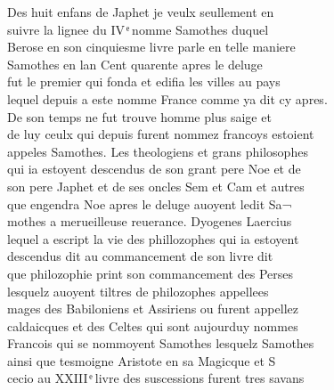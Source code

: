 \documentclass[12pt]{article}
\begin{document}
Des huit enfans de Japhet je veulx seullement en\\
suivre la lignee du
          IV ͤ nomme Samothes duquel\\
Berose en son cinquiesme livre
          parle en telle maniere\\
Samothes en lan Cent quarente apres le
                deluge\\
fut le premier qui fonda et edifia les villes au pays\\
lequel depuis a este nomme France comme ya dit cy apres.\\
De son temps ne
              fut trouve homme plus saige et\\
de luy ceulx qui depuis furent nommez
              francoys estoient\\
appeles Samothes. Les theologiens et grans
              philosophes\\
qui ia estoyent descendus de son grant pere Noe et de\\
son pere Japhet et
          de ses oncles Sem et Cam 
          et autres\\
que engendra Noe apres le deluge
          auoyent ledit Sa¬\\
mothes a merueilleuse
          reuerance. Dyogenes Laercius\\
lequel a escript la vie des
            phillozophes qui ia estoyent\\
descendus dit au commancement de son livre
            dit\\
que philozophie print son commancement des Perses\\
lesquelz
          auoyent tiltres de philozophes appellees\\
mages des Babiloniens et Assiriens ou
          furent appellez\\
caldaicques et des Celtes qui sont aujourduy nommes\\
Francois qui se nommoyent Samothes lesquelz Samothes\\
ainsi que tesmoigne
            Aristote en sa Magicque et S\\
cecio au XXIII ͤ livre des
            suscessions furent tres savans



\newpage
\end{document}
